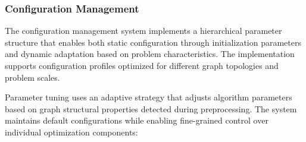 \subsubsection{Configuration Management}

The configuration management system implements a hierarchical parameter structure that enables both static configuration through initialization parameters and dynamic adaptation based on problem characteristics. The implementation supports configuration profiles optimized for different graph topologies and problem scales.

Parameter tuning uses an adaptive strategy that adjusts algorithm parameters based on graph structural properties detected during preprocessing. The system maintains default configurations while enabling fine-grained control over individual optimization components:

